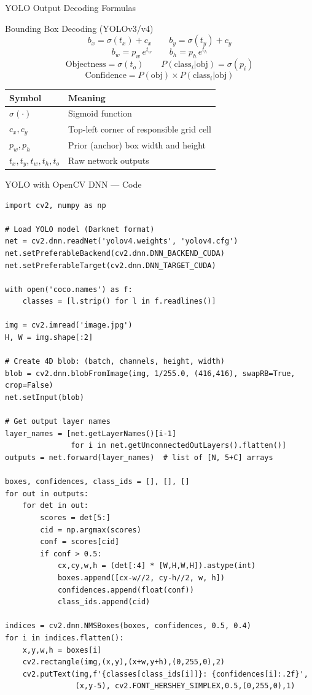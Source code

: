 \documentclass[aspectratio=169]{beamer}
\begin{document}
\begin{frame}{YOLO Output Decoding Formulas}
  \begin{block}{Bounding Box Decoding (YOLOv3/v4)}
    \[
      b_x = \sigma(t_x) + c_x \qquad b_y = \sigma(t_y) + c_y
    \]
    \[
      b_w = p_w\, e^{t_w} \qquad b_h = p_h\, e^{t_h}
    \]
    \[
      \text{Objectness} = \sigma(t_o) \qquad
      P(\text{class}_i | \text{obj}) = \sigma(p_i)
    \]
    \[
      \text{Confidence} = P(\text{obj}) \times P(\text{class}_i | \text{obj})
    \]
  \end{block}
  \begin{tabular}{ll}
    \toprule
    \textbf{Symbol} & \textbf{Meaning} \\
    \midrule
    $\sigma(\cdot)$ & Sigmoid function \\
    $c_x, c_y$      & Top-left corner of responsible grid cell \\
    $p_w, p_h$      & Prior (anchor) box width and height \\
    $t_x, t_y, t_w, t_h, t_o$ & Raw network outputs \\
    \bottomrule
  \end{tabular}
\end{frame}

\begin{frame}[fragile]{YOLO with OpenCV DNN — Code}
\begin{lstlisting}
import cv2, numpy as np

# Load YOLO model (Darknet format)
net = cv2.dnn.readNet('yolov4.weights', 'yolov4.cfg')
net.setPreferableBackend(cv2.dnn.DNN_BACKEND_CUDA)
net.setPreferableTarget(cv2.dnn.DNN_TARGET_CUDA)

with open('coco.names') as f:
    classes = [l.strip() for l in f.readlines()]

img = cv2.imread('image.jpg')
H, W = img.shape[:2]

# Create 4D blob: (batch, channels, height, width)
blob = cv2.dnn.blobFromImage(img, 1/255.0, (416,416), swapRB=True, crop=False)
net.setInput(blob)

# Get output layer names
layer_names = [net.getLayerNames()[i-1]
               for i in net.getUnconnectedOutLayers().flatten()]
outputs = net.forward(layer_names)  # list of [N, 5+C] arrays

boxes, confidences, class_ids = [], [], []
for out in outputs:
    for det in out:
        scores = det[5:]
        cid = np.argmax(scores)
        conf = scores[cid]
        if conf > 0.5:
            cx,cy,w,h = (det[:4] * [W,H,W,H]).astype(int)
            boxes.append([cx-w//2, cy-h//2, w, h])
            confidences.append(float(conf))
            class_ids.append(cid)

indices = cv2.dnn.NMSBoxes(boxes, confidences, 0.5, 0.4)
for i in indices.flatten():
    x,y,w,h = boxes[i]
    cv2.rectangle(img,(x,y),(x+w,y+h),(0,255,0),2)
    cv2.putText(img,f'{classes[class_ids[i]]}: {confidences[i]:.2f}',
                (x,y-5), cv2.FONT_HERSHEY_SIMPLEX,0.5,(0,255,0),1)
\end{lstlisting}
\end{frame}
\end{document}
